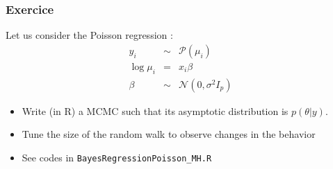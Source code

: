 \begin{frame}[fragile]\frametitle{Exercice}
 
Let us consider the Poisson regression : 
\begin{eqnarray*}
y_i &\sim& \mathcal{P}(\mu_i) \\
\log \mu_i &= & x_i \beta\\
\beta &\sim& \mathcal{N}(0, \sigma^2I_p) 
\end{eqnarray*}
 
\begin{itemize}
 \item Write (in R) a MCMC such that its asymptotic distribution is $p(\theta | y)$.
 \item Tune the size of the random walk to observe changes in the behavior
 \item See codes in \verb|BayesRegressionPoisson_MH.R|
\end{itemize}
  


 
\end{frame}



 





